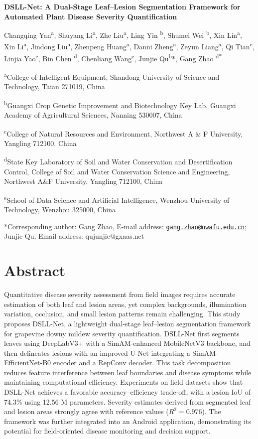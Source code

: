 \documentclass[
]{article}
\author{}
\date{}
\begin{document}
\textbf{DSLL-Net: A Dual-Stage Leaf--Lesion Segmentation Framework for
Automated Plant Disease Severity Quantification}

Changqing Yan\textsuperscript{a}, Shuyang Li\textsuperscript{a}, Zhe
Liu\textsuperscript{a}, Ling Yin \textsuperscript{b}, Shumei Wei
\textsuperscript{b}, Xin Lin\textsuperscript{a}, Xin
Li\textsuperscript{a}, Jindong Liu\textsuperscript{a}, Zhenpeng
Huang\textsuperscript{a}, Danni Zheng\textsuperscript{a}, Zeyun
Liang\textsuperscript{a}, Qi Tian\textsuperscript{c}, Linjia
Yao\textsuperscript{c}, Bin Chen \textsuperscript{d}, Chenliang
Wang\textsuperscript{e}, Junjie Qu\textsuperscript{b}*, Gang Zhao
\textsuperscript{d*}

\textsuperscript{a}College of Intelligent Equipment, Shandong University
of Science and Technology, Taian 271019, China

\textsuperscript{b}Guangxi Crop Genetic Improvement and Biotechnology
Key Lab, Guangxi Academy of Agricultural Sciences, Nanning 530007, China

\textsuperscript{c}College of Natural Resources and Environment,
Northwest A \& F University, Yangling 712100, China

\textsuperscript{d}State Key Laboratory of Soil and Water Conservation
and Desertification Control, College of Soil and Water Conservation
Science and Engineering, Northwest A\&F University, Yangling 712100,
China

\textsuperscript{e}School of Data Science and Artificial Intelligence,
Wenzhou University of Technology, Wenzhou 325000, China

*Corresponding author: Gang Zhao, E-mail address:
\href{mailto:gang.zhao@nwafu.edu.cn}{\nolinkurl{gang.zhao@nwafu.edu.cn}};
Junjie Qu, Email address: qujunjie@gxaas.net

\hypertarget{abstract}{%
\section{Abstract}\label{abstract}}

Quantitative disease severity assessment from field images requires
accurate estimation of both leaf and lesion areas, yet complex
backgrounds, illumination variation, occlusion, and small lesion patterns
remain challenging. This study proposes DSLL-Net, a lightweight
dual-stage leaf--lesion segmentation framework for grapevine downy mildew
severity quantification. DSLL-Net first segments leaves using DeepLabV3+
with a SimAM-enhanced MobileNetV3 backbone, and then delineates lesions
with an improved U-Net integrating a SimAM-EfficientNet-B0 encoder and a
RepConv decoder. This task decomposition reduces feature interference
between leaf boundaries and disease symptoms while maintaining
computational efficiency. Experiments on field datasets show that
DSLL-Net achieves a favorable accuracy--efficiency trade-off, with a
lesion IoU of 74.3\% using 12.56 M parameters. Severity estimates derived
from segmented leaf and lesion areas strongly agree with reference values
(\(R^{2}=0.976\)). The framework was further integrated into an Android
application, demonstrating its potential for field-oriented disease
monitoring and decision support.
\end{document}
